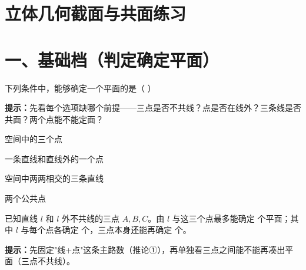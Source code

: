 \documentclass{exam-zh}
\begin{document}
\section*{立体几何截面与共面练习}

\section*{一、基础档（判定确定平面）}


\begin{question}[points=6]
  \noindent
  \begin{minipage}[t]{\dimexpr\linewidth-60mm-6mm\relax}
    \vspace{0pt}
    下列条件中，能够确定一个平面的是（    ）
    \begin{hintbox}
\textbf{提示：}先看每个选项缺哪个前提——三点是否不共线？点是否在线外？三条线是否共面？两个点能不能定面？\end{hintbox}

    \par
    \begin{choices}[columns=1]
      \item 空间中的三个点
      \item 一条直线和直线外的一个点
      \item 空间中两两相交的三条直线
      \item 两个公共点
    \end{choices}
  \end{minipage}\hfill
  \begin{diagramcoltikz}{60mm}{四个选项分别画出示意图，数各自能定几个面。}
  }
  \end{diagramcoltikz}
\end{question}




\begin{question}[points=6]
  已知直线 $l$ 和 $l$ 外不共线的三点 $A,B,C$。由 $l$ 与这三个点最多能确定 \underline{\quad\quad} 个平面；其中 $l$ 与每个点各确定 \underline{\quad} 个，三点本身还能再确定 \underline{\quad} 个。
  \begin{hintbox}
\textbf{提示：}先固定"线+点"这条主路数（推论①），再单独看三点之间能不能再凑出平面（三点不共线）。\end{hintbox}

\end{question}
\end{document}

